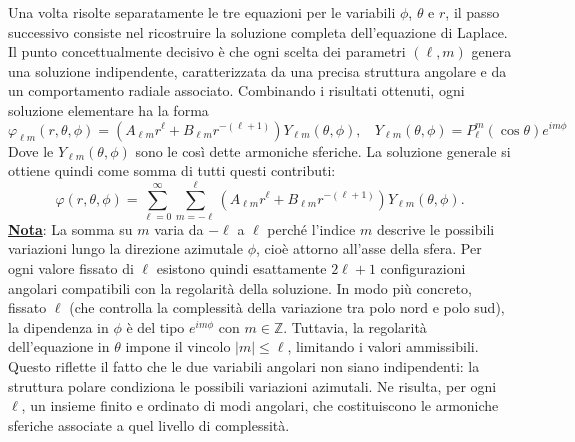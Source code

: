 \documentclass[a4paper,12pt]{report}
\begin{document}
Una volta risolte separatamente le tre equazioni per le variabili $\phi$, $\theta$ e $r$, il passo successivo consiste nel ricostruire la soluzione completa dell’equazione di Laplace. Il punto concettualmente decisivo è che ogni scelta dei parametri $(\ell,m)$ genera una soluzione indipendente, caratterizzata da una precisa struttura angolare e da un comportamento radiale associato. Combinando i risultati ottenuti, ogni soluzione elementare ha la forma
\[
\varphi_{\ell m}(r,\theta,\phi)=\left(A_{\ell m} r^\ell + B_{\ell m} r^{-(\ell+1)}\right)Y_{\ell m}(\theta,\phi), \ \ \ \ 
Y_{\ell m}(\theta,\phi)=P_\ell^m(\cos\theta)e^{im\phi}
\]
Dove le $Y_{\ell m}(\theta,\phi)$ sono le così dette armoniche sferiche. La soluzione generale si ottiene quindi come somma di tutti questi contributi:
\[
\varphi(r,\theta,\phi)=
\sum_{\ell=0}^{\infty}
\sum_{m=-\ell}^{\ell}
\left(A_{\ell m} r^\ell + B_{\ell m} r^{-(\ell+1)}\right)
Y_{\ell m}(\theta,\phi).
\]
\underline{\textbf{Nota}}: La somma su $m$ varia da $-\ell$ a $\ell$ perché l’indice $m$ descrive le possibili variazioni lungo la direzione azimutale $\phi$, cioè attorno all’asse della sfera. Per ogni valore fissato di $\ell$ esistono quindi esattamente $2\ell+1$ configurazioni angolari compatibili con la regolarità della soluzione. In modo più concreto, fissato $\ell$ (che controlla la complessità della variazione tra polo nord e polo sud), la dipendenza in $\phi$ è del tipo $e^{im\phi}$ con $m\in\mathbb{Z}$. Tuttavia, la regolarità dell’equazione in $\theta$ impone il vincolo $|m|\le \ell$, limitando i valori ammissibili. Questo riflette il fatto che le due variabili angolari non siano indipendenti: la struttura polare condiziona le possibili variazioni azimutali. Ne risulta, per ogni $\ell$, un insieme finito e ordinato di modi angolari, che costituiscono le armoniche sferiche associate a quel livello di complessità.
\\
\end{document}
